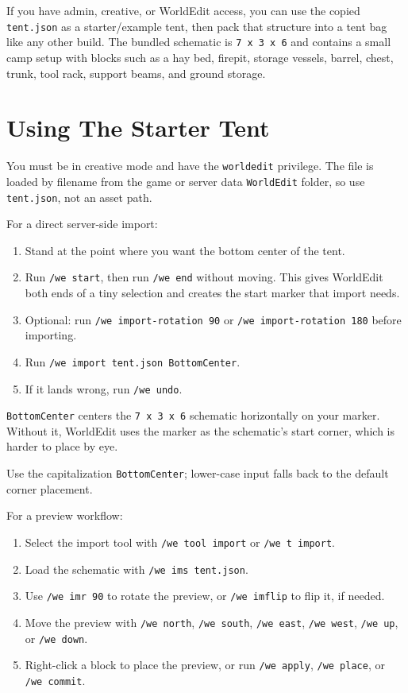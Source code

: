 \documentclass[
  11pt,
  letterpaper,
  titlepage]{article}
\providecommand{\tightlist}{%
  \setlength{\itemsep}{0pt}\setlength{\parskip}{0pt}}
\begin{document}
If you have admin, creative, or WorldEdit access, you can use the copied
\texttt{tent.json} as a starter/example tent, then pack that structure
into a tent bag like any other build. The bundled schematic is
\texttt{7\ x\ 3\ x\ 6} and contains a small camp setup with blocks such
as a hay bed, firepit, storage vessels, barrel, chest, trunk, tool rack,
support beams, and ground storage.

\section{Using The Starter Tent}\label{using-the-starter-tent}

You must be in creative mode and have the \texttt{worldedit} privilege.
The file is loaded by filename from the game or server data
\texttt{WorldEdit} folder, so use \texttt{tent.json}, not an asset path.

For a direct server-side import:

\begin{enumerate}
\def\labelenumi{\arabic{enumi}.}
\tightlist
\item
  Stand at the point where you want the bottom center of the tent.
\item
  Run \texttt{/we\ start}, then run \texttt{/we\ end} without moving.
  This gives WorldEdit both ends of a tiny selection and creates the
  start marker that import needs.
\item
  Optional: run \texttt{/we\ import-rotation\ 90} or
  \texttt{/we\ import-rotation\ 180} before importing.
\item
  Run \texttt{/we\ import\ tent.json\ BottomCenter}.
\item
  If it lands wrong, run \texttt{/we\ undo}.
\end{enumerate}

\texttt{BottomCenter} centers the \texttt{7\ x\ 3\ x\ 6} schematic
horizontally on your marker. Without it, WorldEdit uses the marker as
the schematic's start corner, which is harder to place by eye.

Use the capitalization \texttt{BottomCenter}; lower-case input falls
back to the default corner placement.

For a preview workflow:

\begin{enumerate}
\def\labelenumi{\arabic{enumi}.}
\tightlist
\item
  Select the import tool with \texttt{/we\ tool\ import} or
  \texttt{/we\ t\ import}.
\item
  Load the schematic with \texttt{/we\ ims\ tent.json}.
\item
  Use \texttt{/we\ imr\ 90} to rotate the preview, or
  \texttt{/we\ imflip} to flip it, if needed.
\item
  Move the preview with \texttt{/we\ north}, \texttt{/we\ south},
  \texttt{/we\ east}, \texttt{/we\ west}, \texttt{/we\ up}, or
  \texttt{/we\ down}.
\item
  Right-click a block to place the preview, or run \texttt{/we\ apply},
  \texttt{/we\ place}, or \texttt{/we\ commit}.
\end{enumerate}
\end{document}
